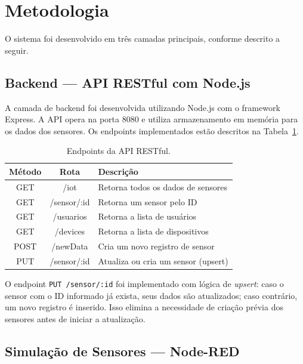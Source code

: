 \documentclass[12pt]{unisenaiclass}
\begin{document}
\section{Metodologia}

O sistema foi desenvolvido em três camadas principais, conforme descrito a seguir.

\subsection{Backend — API RESTful com Node.js}

A camada de backend foi desenvolvida utilizando Node.js com o framework Express. A API opera na porta 8080 e utiliza armazenamento em memória para os dados dos sensores. Os endpoints implementados estão descritos na Tabela~\ref{tab:endpoints}.

\begin{table}[H]
    \centering
    \caption{Endpoints da API RESTful.}
    \label{tab:endpoints}
    \begin{tabular}{|c|c|p{6cm}|}
        \hline
        \textbf{Método} & \textbf{Rota} & \textbf{Descrição} \\ \hline
        GET  & /iot             & Retorna todos os dados de sensores \\ \hline
        GET  & /sensor/:id      & Retorna um sensor pelo ID \\ \hline
        GET  & /usuarios        & Retorna a lista de usuários \\ \hline
        GET  & /devices         & Retorna a lista de dispositivos \\ \hline
        POST & /newData         & Cria um novo registro de sensor \\ \hline
        PUT  & /sensor/:id      & Atualiza ou cria um sensor (upsert) \\ \hline
    \end{tabular}
\end{table}

O endpoint \texttt{PUT /sensor/:id} foi implementado com lógica de \textit{upsert}: caso o sensor com o ID informado já exista, seus dados são atualizados; caso contrário, um novo registro é inserido. Isso elimina a necessidade de criação prévia dos sensores antes de iniciar a atualização.

\subsection{Simulação de Sensores — Node-RED}
\end{document}
